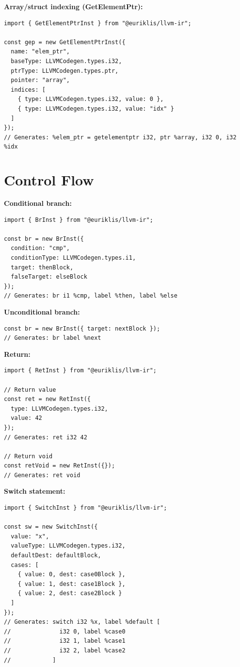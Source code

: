 \documentclass[11pt,oneside]{book}
\begin{document}
\textbf{Array/struct indexing (GetElementPtr):}
\begin{lstlisting}[style=ts]
import { GetElementPtrInst } from "@euriklis/llvm-ir";

const gep = new GetElementPtrInst({
  name: "elem_ptr",
  baseType: LLVMCodegen.types.i32,
  ptrType: LLVMCodegen.types.ptr,
  pointer: "array",
  indices: [
    { type: LLVMCodegen.types.i32, value: 0 },
    { type: LLVMCodegen.types.i32, value: "idx" }
  ]
});
// Generates: %elem_ptr = getelementptr i32, ptr %array, i32 0, i32 %idx
\end{lstlisting}

\section{Control Flow}

\textbf{Conditional branch:}
\begin{lstlisting}[style=ts]
import { BrInst } from "@euriklis/llvm-ir";

const br = new BrInst({
  condition: "cmp",
  conditionType: LLVMCodegen.types.i1,
  target: thenBlock,
  falseTarget: elseBlock
});
// Generates: br i1 %cmp, label %then, label %else
\end{lstlisting}

\textbf{Unconditional branch:}
\begin{lstlisting}[style=ts]
const br = new BrInst({ target: nextBlock });
// Generates: br label %next
\end{lstlisting}

\textbf{Return:}
\begin{lstlisting}[style=ts]
import { RetInst } from "@euriklis/llvm-ir";

// Return value
const ret = new RetInst({
  type: LLVMCodegen.types.i32,
  value: 42
});
// Generates: ret i32 42

// Return void
const retVoid = new RetInst({});
// Generates: ret void
\end{lstlisting}

\textbf{Switch statement:}
\begin{lstlisting}[style=ts]
import { SwitchInst } from "@euriklis/llvm-ir";

const sw = new SwitchInst({
  value: "x",
  valueType: LLVMCodegen.types.i32,
  defaultDest: defaultBlock,
  cases: [
    { value: 0, dest: case0Block },
    { value: 1, dest: case1Block },
    { value: 2, dest: case2Block }
  ]
});
// Generates: switch i32 %x, label %default [
//              i32 0, label %case0
//              i32 1, label %case1
//              i32 2, label %case2
//            ]
\end{lstlisting}
\end{document}
